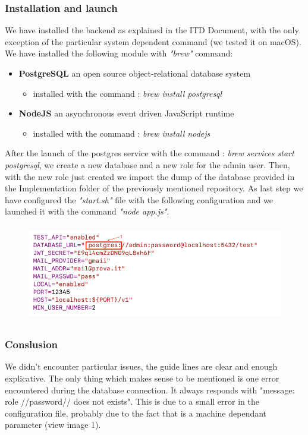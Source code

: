 \documentclass{article}
\begin{document}
\subsubsection{Installation and launch}
	We have installed the backend as explained in the ITD Document, with the only exception of the particular system dependent command (we tested it on macOS).\newline
	We have installed the following module with \textit{"brew"} command:
	\begin{itemize}
		\item \textbf{PostgreSQL} an open source object-relational database system
		\begin{itemize}
			\item	installed with the command : \textit{brew install postgresql}
		\end{itemize}
		\item \textbf{NodeJS} an asynchronous event driven JavaScript runtime
		\begin{itemize}
			\item	installed with the command : \textit{brew install nodejs}
		\end{itemize}
	\end{itemize}
	After the launch of the postgres service with the command : \textit{brew services start postgresql}, we create a new database and a new role for the admin user. \newline
	Then, with the new role just created we import the dump of the database provided in the Implementation folder of the previously mentioned repository.
	As last step we have configured the \textit{"start.sh"} file with the following configuration and we launched it with the command \textit{"node app.js"}.
	\begin{figure}[h!]
		\centering
		\includegraphics[height=4.25cm,keepaspectratio]{Figures/error1}
	\end{figure}
	
\subsubsection{Conslusion}
We didn't encounter particular issues, the guide lines are clear and enough explicative.\newline
The only thing which makes sense to be mentioned is one error encountered during the database connection. It always responds with "message: role //password// does not exists". This is due to a small error in the configuration file, probably due to the fact that is a machine dependant parameter (view image 1).
\end{document}
